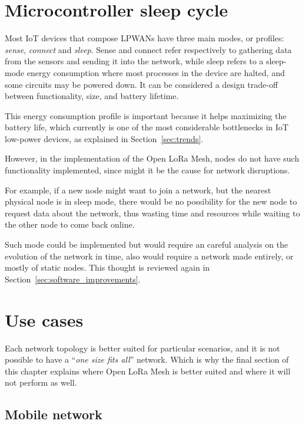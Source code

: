 	\section{Microcontroller sleep cycle}\label{sec:sleep}
	
		Most IoT devices that compose LPWANs have three main modes, or profiles: \textit{sense}, \textit{connect} and \textit{sleep}.
		Sense and connect refer respectively to gathering data from the sensors and sending it into the network, while sleep refers to a sleep-mode energy consumption where most processes in the device are halted, and some circuits may be powered down.
		It can be considered a design trade-off between functionality, size, and battery lifetime.
		
		This energy consumption profile is important because it helps maximizing the battery life, which currently is one of the most considerable bottlenecks in IoT low-power devices, as explained in Section~\ref{sec:trends}.
		
		However, in the implementation of the Open LoRa Mesh, nodes do not have such functionality implemented, since might it be the cause for network disruptions.
		
		For example, if a new node might want to join a network, but the nearest physical node is in sleep mode, there would be no possibility for the new node to request data about the network, thus wasting time and resources while waiting to the other node to come back online.
		
		Such mode could be implemented but would require an careful analysis on the evolution of the network in time, also would require a network made entirely, or mostly of static nodes.
		This thought is reviewed again in Section~\ref{sec:software_improvements}.
			
	\section{Use cases}
		
		Each network topology is better suited for particular scenarios, and it is not possible to have a ``\textit{one size fits all}'' network.
		Which is why the final section of this chapter explains where Open LoRa Mesh is better suited and where it will not perform as well.
		
		\subsection{Mobile network}
		

